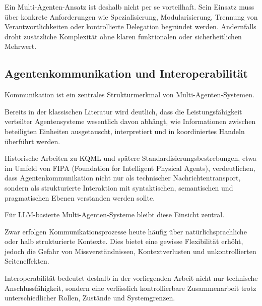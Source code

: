 Ein Multi-Agenten-Ansatz ist deshalb nicht per se vorteilhaft. \cite{jennings_roadmap_1998, yan_beyond_2025, khan_beyond_2026} Sein Einsatz muss über konkrete Anforderungen wie Spezialisierung, Modularisierung, Trennung von Verantwortlichkeiten oder kontrollierte Delegation begründet werden. \cite{jennings_roadmap_1998,wooldridge_intelligent_1995,xue_all--one_2024} Andernfalls droht zusätzliche Komplexität ohne klaren funktionalen oder sicherheitlichen Mehrwert. \cite{wong_adding_2000,yan_beyond_2025,khan_beyond_2026, raza_trism_2026}

\subsection{Agentenkommunikation und Interoperabilität}

Kommunikation ist ein zentrales Strukturmerkmal von Multi-Agenten-Systemen. \cite{russell_artificial_2022,chalupsky_overview_1993,jennings_roadmap_1998}

Bereits in der klassischen Literatur wird deutlich, dass die Leistungsfähigkeit verteilter Agentensysteme wesentlich davon abhängt, wie Informationen zwischen beteiligten Einheiten ausgetauscht, interpretiert und in koordiniertes Handeln überführt werden. \cite{jennings_roadmap_1998,russell_artificial_2022,botti_agentic_2025}

Historische Arbeiten zu KQML und spätere Standardisierungsbestrebungen, etwa im Umfeld von FIPA (Foundation for Intelligent Physical Agents), verdeutlichen, dass Agentenkommunikation nicht nur als technischer Nachrichtentransport, sondern als strukturierte Interaktion mit syntaktischen, semantischen und pragmatischen Ebenen verstanden werden sollte. \cite{chalupsky_overview_1993, fipa, botti_agentic_2025}

Für LLM-basierte Multi-Agenten-Systeme bleibt diese Einsicht zentral. \cite{wang_large_2026, yan_beyond_2025}

Zwar erfolgen Kommunikationsprozesse heute häufig über natürlichsprachliche oder halb strukturierte Kontexte. Dies bietet eine gewisse Flexibilität erhöht, jedoch die Gefahr von Missverständnissen, Kontextverlusten und unkontrollierten Seiteneffekten. \cite{yan_beyond_2025,ferrag_prompt_2026}

Interoperabilität bedeutet deshalb in der vorliegenden Arbeit nicht nur technische Anschlussfähigkeit, sondern eine verlässlich kontrollierbare Zusammenarbeit trotz unterschiedlicher Rollen, Zustände und Systemgrenzen. \cite{fipa, chalupsky_overview_1993, anbiaee_security_2026}

